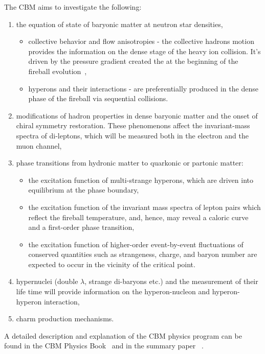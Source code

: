 The \gls{CBM} aims to investigate the following:
\begin{enumerate}
    \item the equation of state of baryonic matter at neutron star densities,
    \begin{itemize}
        \item collective behavior and flow anisotropies - the collective hadrons motion provides the information on the dense stage of the heavy ion collision. It's driven by the pressure gradient created the at the beginning of the fireball evolution~\cite{Reisdorf_2007},
        \item hyperons and their interactions - are preferentially produced in the dense phase of the fireball via sequential collisions.
    \end{itemize}
    \item modifications of hadron properties in dense baryonic matter and the onset of chiral symmetry restoration. These phenomenons affect the invariant-mass spectra of di-leptons, which will be measured both in the electron and the muon channel,
    \item phase transitions from hydronic matter to quarkonic or partonic matter:
    \begin{itemize}
        \item the excitation function of multi-strange hyperons, which are driven into equilibrium at the phase boundary,
        \item the excitation function of the invariant mass spectra of lepton pairs which reflect the fireball temperature, and, hence, may reveal a caloric curve and a first-order phase transition,
        \item the excitation function of higher-order event-by-event fluctuations of conserved quantities such as strangeness, charge, and baryon number are expected to occur in the vicinity of the critical point.
    \end{itemize}

     
     
    \item hypernuclei (double $\lambda$, strange di-baryons etc.) and the measurement of their life time will provide information on the hyperon-nucleon and hyperon-hyperon interaction,
    \item charm production mechanisms.
\end{enumerate}
A detailed description and explanation of the \gls{CBM} physics program can be found in the \gls{CBM} Physics Book~\cite{CBM_physics} and in the summary paper~
\cite{Ablyazimov_2017}.




